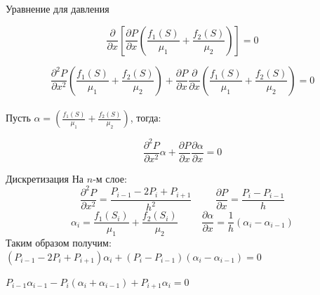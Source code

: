 \documentclass[14pt, aspectratio=169]{beamer}
\begin{document}
\begin{frame} {Уравнение для давления}

    $$
    \frac{\partial}{\partial x} \left[ \frac{\partial P}{\partial x} \left( \frac{f_1(S)}{\mu_1} + \frac{f_2(S)}{\mu_2} \right) \right] = 0
    $$

    $$
    \frac{\partial^2 P}{\partial x^2} \left( \frac{f_1(S)}{\mu_1} + \frac{f_2(S)}{\mu_2} \right) + \frac{\partial P}{\partial x} \frac{\partial}{\partial x}\left(  \frac{f_1(S)}{\mu_1} + \frac{f_2(S)}{\mu_2} \right) = 0
    $$
    \\

    Пусть $\alpha = \left( \frac{f_1(S)}{\mu_1} + \frac{f_2(S)}{\mu_2} \right)$, тогда:

    $$
    \frac{\partial^2 P}{\partial x^2} \alpha + \frac{\partial P}{\partial x} \frac{\partial \alpha}{\partial x} = 0
    $$

\end{frame}

\begin{frame}{Дискретизация}
    На $n$-м слое:
    $$
    \frac{\partial^2 P}{\partial x^2} = \frac{P_{i-1} - 2 P_i + P_{i+1} }{h^2} \hspace{1cm}
    \frac{\partial P}{\partial x} = \frac{P_i - P_{i-1} }{h}
    $$
    $$
    \alpha_i = \frac{f_1(S_i)}{\mu_1} + \frac{f_2(S_i)}{\mu_2} 
    \hspace{1cm} 
    \frac{\partial \alpha}{\partial x} = \frac{1}{h} \left( \alpha_i - \alpha_{i-1} \right)
    $$
    Таким образом получим:
    $
    \left( P_{i-1} - 2 P_i + P_{i+1} \right) \alpha_i + \left( P_i - P_{i-1} \right) \left( \alpha_i - \alpha_{i-1} \right) = 0
    $
    \begin{block}{}
    $P_{i-1} \alpha_{i-1} - P_i (\alpha_i + \alpha_{i-1}) + P_{i+1} \alpha_i = 0$
    \end{block}
\end{frame}
\end{document}
